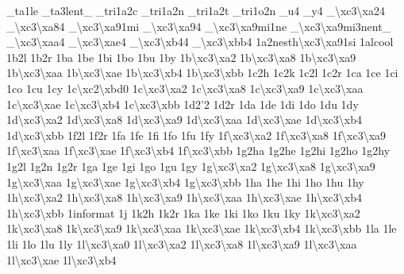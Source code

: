 \begin{DoxyCompactItemize}
\-\_\-ta1le \-\_\-ta3lent\-\_\- \-\_\-tri1a2c \-\_\-tri1a2n \-\_\-tri1a2t \-\_\-tri1o2n \-\_\-u4 \-\_\-y4 \-\_\-\textbackslash{}xc3\textbackslash{}xa24 \-\_\-\textbackslash{}xc3\textbackslash{}xa84 \-\_\-\textbackslash{}xc3\textbackslash{}xa91mi \-\_\-\textbackslash{}xc3\textbackslash{}xa94 \-\_\-\textbackslash{}xc3\textbackslash{}xa9mi1ne \-\_\-\textbackslash{}xc3\textbackslash{}xa9mi3nent\-\_\- \-\_\-\textbackslash{}xc3\textbackslash{}xaa4 \-\_\-\textbackslash{}xc3\textbackslash{}xae4 \-\_\-\textbackslash{}xc3\textbackslash{}xb44 \-\_\-\textbackslash{}xc3\textbackslash{}xbb4 1a2nesth\textbackslash{}xc3\textbackslash{}xa91si 1alcool 1b2l 1b2r 1ba 1be 1bi 1bo 1bu 1by 1b\textbackslash{}xc3\textbackslash{}xa2 1b\textbackslash{}xc3\textbackslash{}xa8 1b\textbackslash{}xc3\textbackslash{}xa9 1b\textbackslash{}xc3\textbackslash{}xaa 1b\textbackslash{}xc3\textbackslash{}xae 1b\textbackslash{}xc3\textbackslash{}xb4 1b\textbackslash{}xc3\textbackslash{}xbb 1c2h 1c2k 1c2l 1c2r 1ca 1ce 1ci 1co 1cu 1cy 1c\textbackslash{}xc2\textbackslash{}xbd0 1c\textbackslash{}xc3\textbackslash{}xa2 1c\textbackslash{}xc3\textbackslash{}xa8 1c\textbackslash{}xc3\textbackslash{}xa9 1c\textbackslash{}xc3\textbackslash{}xaa 1c\textbackslash{}xc3\textbackslash{}xae 1c\textbackslash{}xc3\textbackslash{}xb4 1c\textbackslash{}xc3\textbackslash{}xbb 1d2'2 1d2r 1da 1de 1di 1do 1du 1dy 1d\textbackslash{}xc3\textbackslash{}xa2 1d\textbackslash{}xc3\textbackslash{}xa8 1d\textbackslash{}xc3\textbackslash{}xa9 1d\textbackslash{}xc3\textbackslash{}xaa 1d\textbackslash{}xc3\textbackslash{}xae 1d\textbackslash{}xc3\textbackslash{}xb4 1d\textbackslash{}xc3\textbackslash{}xbb 1f2l 1f2r 1fa 1fe 1fi 1fo 1fu 1fy 1f\textbackslash{}xc3\textbackslash{}xa2 1f\textbackslash{}xc3\textbackslash{}xa8 1f\textbackslash{}xc3\textbackslash{}xa9 1f\textbackslash{}xc3\textbackslash{}xaa 1f\textbackslash{}xc3\textbackslash{}xae 1f\textbackslash{}xc3\textbackslash{}xb4 1f\textbackslash{}xc3\textbackslash{}xbb 1g2ha 1g2he 1g2hi 1g2ho 1g2hy 1g2l 1g2n 1g2r 1ga 1ge 1gi 1go 1gu 1gy 1g\textbackslash{}xc3\textbackslash{}xa2 1g\textbackslash{}xc3\textbackslash{}xa8 1g\textbackslash{}xc3\textbackslash{}xa9 1g\textbackslash{}xc3\textbackslash{}xaa 1g\textbackslash{}xc3\textbackslash{}xae 1g\textbackslash{}xc3\textbackslash{}xb4 1g\textbackslash{}xc3\textbackslash{}xbb 1ha 1he 1hi 1ho 1hu 1hy 1h\textbackslash{}xc3\textbackslash{}xa2 1h\textbackslash{}xc3\textbackslash{}xa8 1h\textbackslash{}xc3\textbackslash{}xa9 1h\textbackslash{}xc3\textbackslash{}xaa 1h\textbackslash{}xc3\textbackslash{}xae 1h\textbackslash{}xc3\textbackslash{}xb4 1h\textbackslash{}xc3\textbackslash{}xbb 1informat 1j 1k2h 1k2r 1ka 1ke 1ki 1ko 1ku 1ky 1k\textbackslash{}xc3\textbackslash{}xa2 1k\textbackslash{}xc3\textbackslash{}xa8 1k\textbackslash{}xc3\textbackslash{}xa9 1k\textbackslash{}xc3\textbackslash{}xaa 1k\textbackslash{}xc3\textbackslash{}xae 1k\textbackslash{}xc3\textbackslash{}xb4 1k\textbackslash{}xc3\textbackslash{}xbb 1la 1le 1li 1lo 1lu 1ly 1l\textbackslash{}xc3\textbackslash{}xa0 1l\textbackslash{}xc3\textbackslash{}xa2 1l\textbackslash{}xc3\textbackslash{}xa8 1l\textbackslash{}xc3\textbackslash{}xa9 1l\textbackslash{}xc3\textbackslash{}xaa 1l\textbackslash{}xc3\textbackslash{}xae 1l\textbackslash{}xc3\textbackslash{}xb4 
\end{DoxyCompactItemize}
